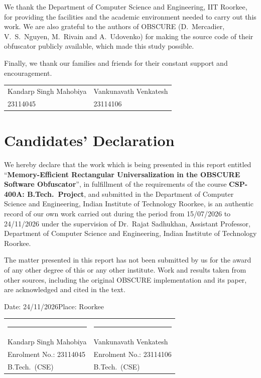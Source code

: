 \documentclass[12pt,a4paper,oneside]{report}
\begin{document}
We thank the Department of Computer Science and Engineering, IIT Roorkee, for providing the
facilities and the academic environment needed to carry out this work. We are also grateful to
the authors of OBSCURE (D.~Mercadier, V.~S.~Nguyen, M.~Rivain and A.~Udovenko) for making the
source code of their obfuscator publicly available, which made this study possible.

Finally, we thank our families and friends for their constant support and encouragement.


\vspace{1.5cm}
\begin{tabular}{@{}p{}p{}@{}}
Kandarp Singh Mahobiya & Vankunavath Venkatesh\\
23114045 & 23114106\\
\end{tabular}

\chapter*{Candidates' Declaration}
We hereby declare that the work which is being presented in this report entitled
``\textbf{Memory-Efficient Rectangular Universalization in the OBSCURE Software Obfuscator}'', in
fulfillment of the requirements of the course \textbf{CSP-400A: B.Tech.\ Project}, and submitted in
the Department of Computer Science and Engineering, Indian Institute of Technology Roorkee, is an
authentic record of our own work carried out during the period from 15/07/2026 to
24/11/2026 under the supervision of Dr.~Rajat Sadhukhan, Assistant Professor, Department of
Computer Science and Engineering, Indian Institute of Technology Roorkee.

The matter presented in this report has not been submitted by us for the award of any other
degree of this or any other institute. Work and results taken from other sources, including the
original OBSCURE implementation and its paper, are acknowledged and cited in the text.

\vspace{0.4cm}
Date: 24/11/2026\hfill Place: Roorkee

\vspace{1.2cm}
\begin{tabular}{@{}p{}p{}@{}}
\rule{4.5cm}{0.4pt} & \rule{4.5cm}{0.4pt}\\[2pt]
Kandarp Singh Mahobiya & Vankunavath Venkatesh\\
Enrolment No.: 23114045 & Enrolment No.: 23114106\\
B.Tech.\ (CSE) & B.Tech.\ (CSE)\\
\end{tabular}
\end{document}

